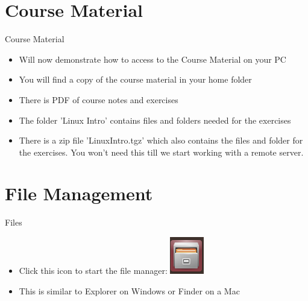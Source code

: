 \section{Course Material}
\begin{frame}{Course Material}
\begin{itemize}
\item Will now demonstrate how to access to the Course Material on your PC
\item You will find a copy of the course material in your home folder
\item There is PDF of course notes and exercises
\item The folder 'Linux Intro' contains files and folders needed for the exercises
\item There is a zip file 'LinuxIntro.tgz' which also contains the files and folder for the exercises. You won't need this till we start working with a remote server. 
\end{itemize}
\end{frame}

\section{File Management}
\begin{frame}{Files}
\begin{itemize}
\item Click this icon to start the file manager:
\includegraphics{imgs/files.png}
\item This is similar to Explorer on Windows or Finder on a Mac
\end{itemize}
\end{frame}

